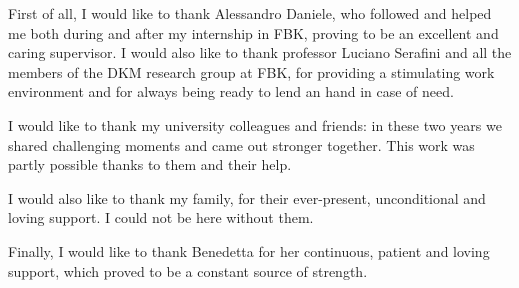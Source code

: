 First of all, I would like to thank Alessandro Daniele, who followed and helped me both during and after my internship in FBK, proving to be an excellent and caring supervisor. I would also like to thank professor Luciano Serafini and all the members of the DKM research group at FBK, for providing a stimulating work environment and for always being ready to lend an hand in case of need. 
\vspace{10pt}

\noindent
I would like to thank my university colleagues and friends: in these two years we shared challenging moments and came out stronger together. This work was partly possible thanks to them and their help.
\vspace{10pt}

\noindent
I would also like to thank my family, for their ever-present, unconditional and loving support. I could not be here without them.
\vspace{10pt}

\noindent
Finally, I would like to thank Benedetta for her continuous, patient and loving support, which proved to be a constant source of strength.